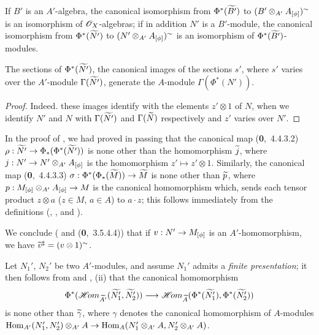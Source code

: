If $B'$ is an $A'$-algebra, the canonical isomorphism from $\Phi^*(\widetilde{B'})$ to
$(B'\otimes_{A'}A_{[\phi]})^\sim$ is an isomorphism of $\mathscr{O}_X$-algebras; if in addition $N'$
is a $B'$-module, the canonical isomorphism from $\Phi^*(\widetilde{N'})$ to
$(N'\otimes_{A'}A_{[\phi]})^\sim$ is an isomorphism of $\Phi^*(\widetilde{B'})$-modules.

\begin{cor}[1.6.6]
\label{1.1.6.6}
The sections of $\Phi^*(\widetilde{N'})$, the canonical images of the sections $s'$, where
$s'$ varies over the $A'$-module $\Gamma(\widetilde{N'})$, generate the $A$-module
$\Gamma(\Phi^*(N'))$.
\end{cor}

\begin{proof}
\label{proof-1.1.6.6}
Indeed. these images identify with the elements $z'\otimes 1$ of $N$, when we identify $N'$
and $N$ with $\Gamma(\widetilde{N'})$ and $\Gamma(\widetilde{N})$ respectively
 and $z'$ varies over $N'$.
\end{proof}

\begin{env}[1.6.7]
\label{1.1.6.7}
In the proof of , we had proved in passing that the canonical map
(\textbf{0},~4.4.3.2) $\rho:\widetilde{N'}\to\Phi_*(\Phi^*(\widetilde{N'}))$ is none other
than the homomorphism $\widetilde{j}$,
where $j:N'\to N'\otimes_{A'}A_{[\phi]}$ is the homomorphism $z'\mapsto z'\otimes 1$.
Similarly, the canonical map (\textbf{0},~4.4.3.3)
$\sigma:\Phi^*(\Phi_*(\widetilde{M}))\to\widetilde{M}$ is none other than $\widetilde{p}$,
where $p:M_{[\phi]}\otimes_{A'}A_{[\phi]}\to M$ is the canonical homomorphism which, sends
each tensor product $z\otimes a$ ($z\in M$, $a\in A$) to $a\cdot z$; this follows immediately
from the definitions (, ,
and ).

We conclude ( and (\textbf{0},~3.5.4.4)) that if $v:N'\to M_{[\phi]}$ is an
$A'$-homomorphism, we have $\widetilde{v}^\sharp=(v\otimes 1)^\sim$.
\end{env}

\begin{env}[1.6.8]
\label{1.1.6.8}
Let $N_1'$, $N_2'$ be two $A'$-modules, and assume $N_1'$ admits a \emph{finite
presentation}; it then follows from  and , (ii) that the
canonical homomorphism 
\[
  \Phi^*(\mathscr{H}\!{om}_{\widetilde{A'}}(\widetilde{N_1'},\widetilde{N_2'}))
  \longrightarrow\mathscr{H}\!{om}_{\widetilde{A}}(\Phi^*(\widetilde{N_1'}),\Phi^*(\widetilde{N_2'}))
\]
is none other than $\widetilde{\gamma}$, where $\gamma$ denotes the canonical homomorphism
of $A$-modules
${\mathop{\mathrm{Hom}}\nolimits}_{A'}(N_1',N_2')\otimes_{A'}A\to{\mathop{\mathrm{Hom}}\nolimits}_A(N_1'\otimes_{A'}A,N_2'\otimes_{A'}A)$.
\end{env}

